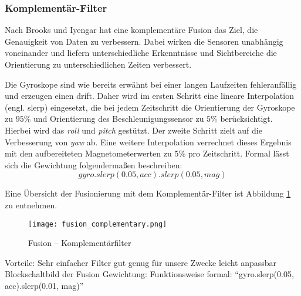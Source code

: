 \subsubsection{Komplementär-Filter}
Nach Brooks und Iyengar \cite{}  hat eine komplementäre Fusion das Ziel, die Genauigkeit von Daten zu verbessern. Dabei wirken die Sensoren unabhängig voneinander und liefern unterschiedliche Erkenntnisse und Sichtbereiche die Orientierung zu unterschiedlichen Zeiten verbessert.

Die Gyroskope sind wie bereits erwähnt bei einer langen Laufzeiten fehleranfällig und erzeugen einen drift. Daher wird im ersten Schritt eine lineare Interpolation (engl. slerp) eingesetzt, die bei jedem Zeitschritt die Orientierung der Gyroskope zu $95\%$ und Orientierung des Beschleunigungssensor zu $5\%$ berücksichtigt. Hierbei wird das \emph{roll} und \emph{pitch} gestützt. Der zweite Schritt zielt auf die Verbesserung von \emph{yaw} ab. Eine weitere Interpolation verrechnet dieses Ergebnis mit den aufbereiteten Magnetometerwerten zu $5\%$ pro Zeitschritt. Formal lässt sich die Gewichtung folgendermaßen beschreiben:
\begin{equation}
    gyro.slerp(0.05, acc).slerp(0.05, mag)
\end{equation}


Eine Übersicht der Fusionierung mit dem Komplementär-Filter ist Abbildung \ref{fig:fusion_complementary} zu entnehmen.

\begin{figure}[ht]
   \centering
   \texttt{[image: fusion\_complementary.png]}
   \caption[]{Fusion -- Komplementärfilter}
   \label{fig:fusion_complementary}
\end{figure}


Vorteile:
Sehr einfacher Filter
gut genug für unsere Zwecke
leicht anpassbar
Blockschaltbild der Fusion
Gewichtung: Funktionsweise formal: “gyro.slerp(0.05, acc).slerp(0.01, mag)”


